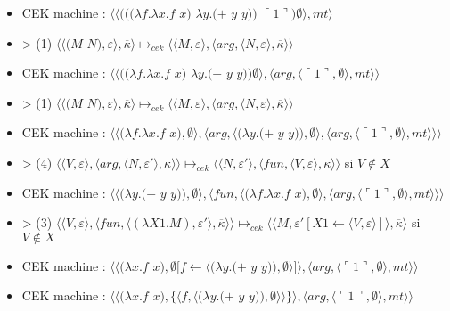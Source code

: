 \documentclass[10pt,a4paper]{report}
\begin{document}
\begin{itemize}
\item[] CEK machine : $\langle\langle(((\lambda f.\lambda x.f$ $x)$ $\lambda y.(+$ $y$ $y))$ $\ulcorner 1\urcorner)\emptyset\rangle,mt\rangle$
\item[] > (1) $\langle\langle(M$ $N),\varepsilon\rangle,\overline{\kappa}\rangle \longmapsto_{cek} \langle \langle M,\varepsilon\rangle,\langle arg,\langle N,\varepsilon\rangle,\overline{\kappa}\rangle\rangle$
\item[] CEK machine : $\langle\langle((\lambda f.\lambda x.f$ $x)$ $\lambda y.(+$ $y$ $y))\emptyset\rangle,\langle arg,\langle\ulcorner 1\urcorner,\emptyset\rangle,mt\rangle\rangle$
\item[] > (1) $\langle\langle(M$ $N),\varepsilon\rangle,\overline{\kappa}\rangle \longmapsto_{cek} \langle \langle M,\varepsilon\rangle,\langle arg,\langle N,\varepsilon\rangle,\overline{\kappa}\rangle\rangle$
\item[] CEK machine : $\langle\langle(\lambda f.\lambda x.f$ $x),\emptyset\rangle,\langle arg,\langle(\lambda y.(+$ $y$ $y)),\emptyset\rangle,\langle arg,\langle\ulcorner 1\urcorner,\emptyset\rangle,mt\rangle\rangle\rangle$
\item[] > (4) $\langle \langle V,\varepsilon\rangle,\langle arg,\langle N,\varepsilon'\rangle,\kappa\rangle\rangle \longmapsto_{cek} \langle \langle N,\varepsilon'\rangle,\langle fun,\langle V,\varepsilon\rangle,\overline{\kappa}\rangle\rangle$ si $V \notin X$
\item[] CEK machine : $\langle\langle(\lambda y.(+$ $y$ $y)),\emptyset\rangle,\langle fun,\langle(\lambda f.\lambda x.f$ $x),\emptyset\rangle,\langle arg,\langle\ulcorner 1\urcorner,\emptyset\rangle,mt\rangle\rangle\rangle$
\item[] > (3) $\langle\langle V,\varepsilon\rangle,\langle fun,\langle (\lambda X1.M),\varepsilon'\rangle,\overline{\kappa} \rangle \rangle \longmapsto_{cek} \langle \langle M,\varepsilon'[X1 \leftarrow \langle V,\varepsilon\rangle]\rangle,\overline{\kappa}\rangle$ si $V \notin X$
\item[] CEK machine : $\langle\langle(\lambda x.f$ $x),\emptyset[f \leftarrow \langle(\lambda y.(+$ $y$ $y)),\emptyset\rangle]\rangle,\langle arg,\langle\ulcorner 1\urcorner,\emptyset\rangle,mt\rangle\rangle$
\item[] CEK machine : $\langle\langle(\lambda x.f$ $x),\{\langle f,\langle(\lambda y.(+$ $y$ $y)),\emptyset\rangle\rangle\}\rangle,\langle arg,\langle\ulcorner 1\urcorner,\emptyset\rangle,mt\rangle\rangle$

\end{itemize}
\end{document}
